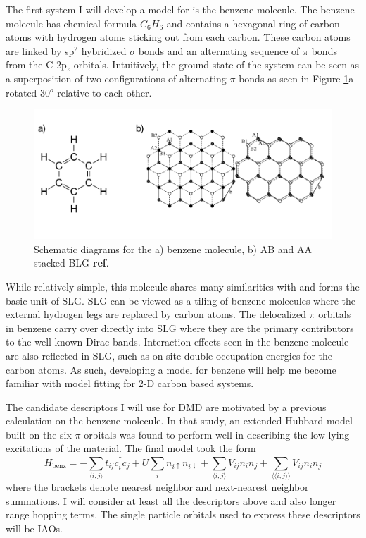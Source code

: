 \documentclass[12pt]{article}
\begin{document}
The first system I will develop a model for is the benzene molecule.
The benzene molecule has chemical formula $C_6 H_6$ and contains a hexagonal ring of carbon atoms with hydrogen atoms sticking out from each carbon.
These carbon atoms are linked by sp$^2$ hybridized $\sigma$ bonds and an alternating sequence of $\pi$ bonds from the C 2p$_z$ orbitals.
Intuitively, the ground state of the system can be seen as a superposition of two configurations of alternating $\pi$ bonds as seen in Figure \ref{fig:proposed}a rotated 30$^o$ relative to each other.

\begin{figure}
\centering
\includegraphics[width=1.0\linewidth]{./figs/proposed.pdf}
\caption{Schematic diagrams for the a) benzene molecule, b) AB and AA stacked BLG \textbf{ref}.}
\label{fig:proposed}
\end{figure}

While relatively simple, this molecule shares many similarities with and forms the basic unit of SLG.
SLG can be viewed as a tiling of benzene molecules where the external hydrogen legs are replaced by carbon atoms.
The delocalized $\pi$ orbitals in benzene carry over directly into SLG where they are the primary contributors to the well known Dirac bands.
Interaction effects seen in the benzene molecule are also reflected in SLG, such as on-site double occupation energies for the carbon atoms.
As such, developing a model for benzene will help me become familiar with model fitting for 2-D carbon based systems.

The candidate descriptors I will use for DMD are motivated by a previous calculation on the benzene molecule.
In that study, an extended Hubbard model built on the six $\pi$ orbitals was found to perform well in describing the low-lying excitations of the material.
The final model took the form 
\begin{equation}
H_\text{benz} = -\sum_{\langle i,j \rangle} t_{ij}c_i^\dagger c_j + U \sum_i n_{i\uparrow}n_{i\downarrow}  + \sum_{\langle i,j \rangle}V_{ij} n_i n_j + \sum_{\langle \langle i,j \rangle\rangle}V_{ij} n_i n_j
\label{Hbenz}
\end{equation}
where the brackets denote nearest neighbor and next-nearest neighbor summations.
I will consider at least all the descriptors above and also longer range hopping terms.
The single particle orbitals used to express these descriptors will be IAOs.
\end{document}
